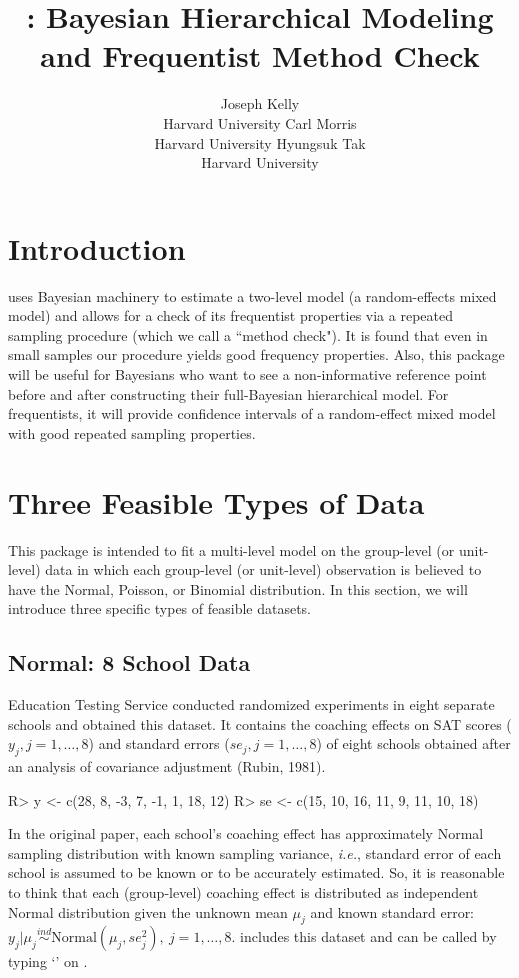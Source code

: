 \documentclass[article]{jss}
\author{Joseph Kelly\\Harvard University \And 
             Carl Morris\\ Harvard University\And
             Hyungsuk Tak\\Harvard University }
\title{\pkg{Rgbp}: Bayesian Hierarchical Modeling and Frequentist Method Check}
\begin{document}

\section[introduction]{Introduction}
 uses Bayesian machinery to estimate a two-level model (a random-effects mixed model) and allows for a check of its frequentist properties via a repeated sampling procedure (which we call a ``method check"). It is found that even in small samples our procedure yields good frequency properties. Also, this package will be useful for Bayesians who want to see a non-informative reference point before and after constructing their full-Bayesian hierarchical model. For frequentists, it will provide confidence intervals of a random-effect mixed model with good repeated sampling properties.

\section[Feasible Data Types]{Three Feasible Types of Data }
This package is intended to fit a multi-level model on the group-level (or unit-level) data in which each group-level (or unit-level) observation is believed to have the Normal, Poisson, or Binomial distribution. In this section, we will introduce three specific types of feasible datasets.

\subsection{Normal: 8 School Data}
Education Testing Service conducted randomized experiments in eight separate schools and obtained this dataset. It contains the coaching effects on SAT scores ($y_{j}, j=1, \ldots, 8$) and standard errors ($se_{j}, j=1, \ldots, 8$) of eight schools obtained after an analysis of covariance adjustment (Rubin, 1981).
\begin{CodeChunk}
\begin{CodeInput}
R> y  <- c(28,  8, -3,  7, -1,  1, 18, 12)
R> se <- c(15, 10, 16, 11,  9, 11, 10, 18)
\end{CodeInput}
\end{CodeChunk}

In the original paper, each school's coaching effect has approximately Normal sampling distribution with known sampling variance, \emph{i.e.}, standard error of each school is assumed to be known or to be accurately estimated. So, it is reasonable to think that each (group-level) coaching effect is distributed as independent Normal distribution given the unknown mean $\mu_{j}$ and known standard error:  $y_{j}\vert\mu_{j}\stackrel{ind}{\sim} \textrm{Normal}(\mu_{j}, se^{2}_{j}),~ j=1, \ldots, 8$.  includes this dataset and can be called by typing `' on .
\end{document}
